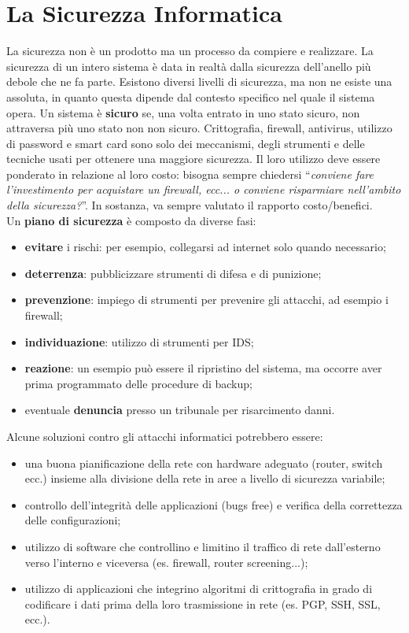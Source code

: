 \section{La Sicurezza Informatica}

La sicurezza non è un prodotto ma un processo da compiere e realizzare.
La sicurezza di un intero sistema è data in realtà dalla sicurezza dell’anello
più debole che ne fa parte. Esistono diversi livelli di sicurezza, ma non ne
esiste una assoluta, in quanto questa dipende dal contesto specifico nel quale
il sistema opera.
Un sistema è \textbf{sicuro} se, una volta entrato in uno stato sicuro, non
attraversa più uno stato non non sicuro.
Crittografia, firewall, antivirus, utilizzo di password e smart card sono solo
dei meccanismi, degli strumenti e delle tecniche usati per ottenere una maggiore
sicurezza. Il loro utilizzo deve essere ponderato in relazione al loro costo:
bisogna sempre chiedersi “\textit{conviene fare l'investimento per acquistare un firewall,
    ecc... o conviene risparmiare nell'ambito della sicurezza?}”. In sostanza, va
sempre valutato il rapporto costo/benefici.\\
Un \textbf{piano di sicurezza} è composto da diverse fasi:

\begin{itemize}
    \item \textbf{evitare} i rischi: per esempio, collegarsi ad internet
          solo quando necessario;
    \item \textbf{deterrenza}: pubblicizzare strumenti di difesa e di punizione;
    \item \textbf{prevenzione}: impiego di strumenti per prevenire gli attacchi,
          ad esempio i firewall;
    \item \textbf{individuazione}: utilizzo di strumenti per IDS;
    \item \textbf{reazione}: un esempio può essere il ripristino del sistema,
          ma occorre aver prima programmato delle procedure di backup;
    \item eventuale \textbf{denuncia} presso un tribunale per risarcimento danni.
\end{itemize}

Alcune soluzioni contro gli attacchi informatici potrebbero essere:

\begin{itemize}
    \item una buona pianificazione della rete con hardware adeguato
          (router, switch ecc.) insieme alla divisione della rete in aree a livello
          di sicurezza variabile;
    \item controllo dell’integrità delle applicazioni (bugs free) e verifica
          della correttezza delle configurazioni;
    \item utilizzo di software che controllino e limitino il traffico di rete
          dall'esterno verso l’interno e viceversa (es. firewall, router screening...);
    \item utilizzo di applicazioni che integrino algoritmi di crittografia in
          grado di codificare i dati prima della loro trasmissione in rete
          (es. PGP, SSH, SSL, ecc.).
\end{itemize}

